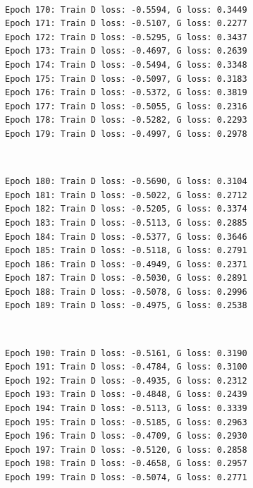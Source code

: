 \documentclass[11pt]{article}
\begin{document}
    \begin{center}
    \end{center}
    { \hspace*{\fill} \\}
    
    \begin{Verbatim}[commandchars=\\\{\}]
Epoch 170: Train D loss: -0.5594, G loss: 0.3449
Epoch 171: Train D loss: -0.5107, G loss: 0.2277
Epoch 172: Train D loss: -0.5295, G loss: 0.3437
Epoch 173: Train D loss: -0.4697, G loss: 0.2639
Epoch 174: Train D loss: -0.5494, G loss: 0.3348
Epoch 175: Train D loss: -0.5097, G loss: 0.3183
Epoch 176: Train D loss: -0.5372, G loss: 0.3819
Epoch 177: Train D loss: -0.5055, G loss: 0.2316
Epoch 178: Train D loss: -0.5282, G loss: 0.2293
Epoch 179: Train D loss: -0.4997, G loss: 0.2978

    \end{Verbatim}

    \begin{center}
    \end{center}
    { \hspace*{\fill} \\}
    
    \begin{Verbatim}[commandchars=\\\{\}]
Epoch 180: Train D loss: -0.5690, G loss: 0.3104
Epoch 181: Train D loss: -0.5022, G loss: 0.2712
Epoch 182: Train D loss: -0.5205, G loss: 0.3374
Epoch 183: Train D loss: -0.5113, G loss: 0.2885
Epoch 184: Train D loss: -0.5377, G loss: 0.3646
Epoch 185: Train D loss: -0.5118, G loss: 0.2791
Epoch 186: Train D loss: -0.4949, G loss: 0.2371
Epoch 187: Train D loss: -0.5030, G loss: 0.2891
Epoch 188: Train D loss: -0.5078, G loss: 0.2996
Epoch 189: Train D loss: -0.4975, G loss: 0.2538

    \end{Verbatim}

    \begin{center}
    \end{center}
    { \hspace*{\fill} \\}
    
    \begin{Verbatim}[commandchars=\\\{\}]
Epoch 190: Train D loss: -0.5161, G loss: 0.3190
Epoch 191: Train D loss: -0.4784, G loss: 0.3100
Epoch 192: Train D loss: -0.4935, G loss: 0.2312
Epoch 193: Train D loss: -0.4848, G loss: 0.2439
Epoch 194: Train D loss: -0.5113, G loss: 0.3339
Epoch 195: Train D loss: -0.5185, G loss: 0.2963
Epoch 196: Train D loss: -0.4709, G loss: 0.2930
Epoch 197: Train D loss: -0.5120, G loss: 0.2858
Epoch 198: Train D loss: -0.4658, G loss: 0.2957
Epoch 199: Train D loss: -0.5074, G loss: 0.2771

    \end{Verbatim}
\end{document}

